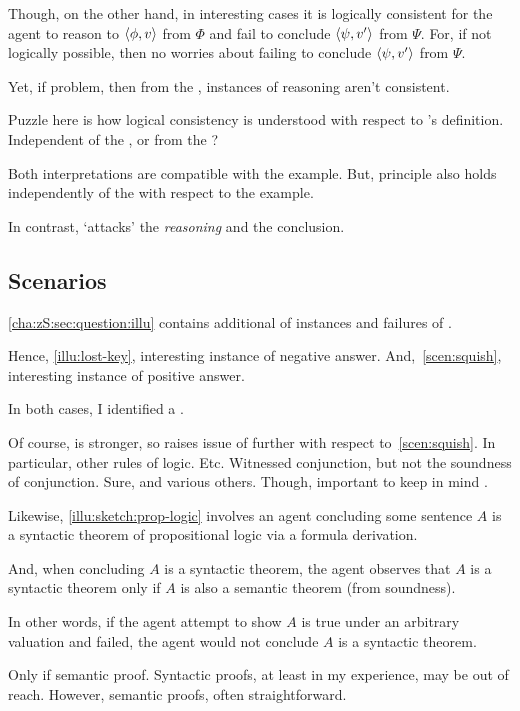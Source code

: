 \begin{note}
  Though, on the other hand, in interesting cases it is logically consistent for the agent to reason to \(\langle \phi, v \rangle\) from \(\Phi\) and fail to conclude \(\langle \psi, v' \rangle\) from \(\Psi\).
  For, if not logically possible, then no worries about failing to conclude \(\langle \psi, v' \rangle\) from \(\Psi\).

  Yet, if problem, then from the \agpe{}, instances of reasoning aren't consistent.

  Puzzle here is how logical consistency is understood with respect to \citeauthor{Pollock:1987un}'s definition.
  Independent of the \agpe{}, or from the \agpe{}?

  Both interpretations are compatible with the example.
  But, principle also holds independently of the \agpe{} with respect to the example.
\end{note}

\begin{note}
  In contrast, \curb{} `attacks' the \emph{reasoning} and the conclusion.
\end{note}



\subsection{Scenarios}
\label{cha:zS:sec:question:scenarios}

\begin{note}
  \autoref{cha:zS:sec:question:illu} contains additional  of instances and failures of \sCing{}.
\end{note}

\begin{note}
  Hence, \autoref{illu:lost-key}, interesting instance of negative answer.
  And,~\autoref{scen:squish}, interesting instance of positive answer.

  In both cases, I identified a \curb{}.

  Of course, \qzS{} is stronger, so raises issue of further  with respect to~\autoref{scen:squish}.
  In particular, other rules of logic.
  Etc.
  Witnessed conjunction, but not the soundness of conjunction.
  Sure, and various others.
  Though, important to keep in mind \curb{}.
\end{note}

\begin{note}
  Likewise, \autoref{illu:sketch:prop-logic} involves an agent concluding some sentence \(A\) is a syntactic theorem of propositional logic via a formula derivation.

  And, when concluding \(A\) is a syntactic theorem, the agent observes that \(A\) is a syntactic theorem only if \(A\) is also a semantic theorem (from soundness).

  In other words, if the agent attempt to show \(A\) is true under an arbitrary valuation and failed, the agent would not conclude \(A\) is a syntactic theorem.

  Only if semantic proof.
  Syntactic proofs, at least in my experience, may be out of reach.
  However, semantic proofs, often straightforward.
\end{note}

